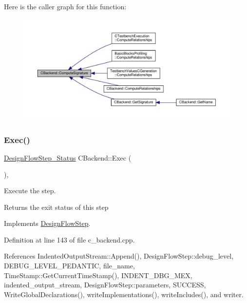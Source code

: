 Here is the caller graph for this function\+:
\nopagebreak
\begin{figure}[H]
\begin{center}
\leavevmode
\includegraphics[width=350pt]{d3/de2/classCBackend_a25f706fe1466ee3c15d680c21f1d3025_icgraph}
\end{center}
\end{figure}
\mbox{\label{classCBackend_ab35c39606dc2d39998ccd35edf7c82df}} 
\subsubsection{\texorpdfstring{Exec()}{Exec()}}
{\footnotesize\ttfamily \hyperlink{design__flow__step_8hpp_afb1f0d73069c26076b8d31dbc8ebecdf}{Design\+Flow\+Step\+\_\+\+Status} C\+Backend\+::\+Exec (\begin{DoxyParamCaption}{ }\end{DoxyParamCaption})\hspace{0.3cm}{\ttfamily [override]}, {\ttfamily [virtual]}}



Execute the step. 

\begin{DoxyReturn}{Returns}
the exit status of this step 
\end{DoxyReturn}


Implements \hyperlink{classDesignFlowStep_a77d7e38493016766098711ea24f60b89}{Design\+Flow\+Step}.



Definition at line 143 of file c\+\_\+backend.\+cpp.



References Indented\+Output\+Stream\+::\+Append(), Design\+Flow\+Step\+::debug\+\_\+level, D\+E\+B\+U\+G\+\_\+\+L\+E\+V\+E\+L\+\_\+\+P\+E\+D\+A\+N\+T\+IC, file\+\_\+name, Time\+Stamp\+::\+Get\+Current\+Time\+Stamp(), I\+N\+D\+E\+N\+T\+\_\+\+D\+B\+G\+\_\+\+M\+EX, indented\+\_\+output\+\_\+stream, Design\+Flow\+Step\+::parameters, S\+U\+C\+C\+E\+SS, Write\+Global\+Declarations(), write\+Implementations(), write\+Includes(), and writer.

